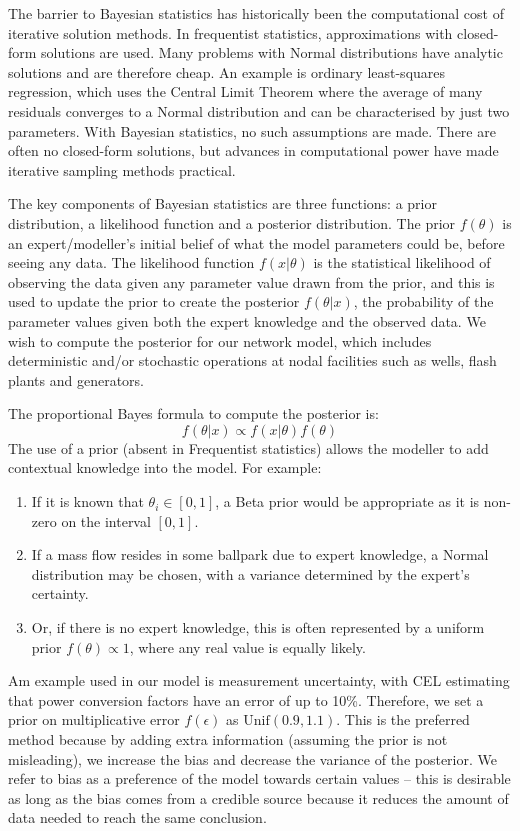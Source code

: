 \documentclass[a4paper, 12pt]{article}
\begin{document}
The barrier to Bayesian statistics has historically been the computational cost of iterative solution methods. In frequentist statistics, approximations with closed-form solutions are used. Many problems with Normal distributions have analytic solutions and are therefore cheap. An example is ordinary least-squares regression, which uses the Central Limit Theorem where the average of many residuals converges to a Normal distribution and can be characterised by just two parameters. With Bayesian statistics, no such assumptions are made. There are often no closed-form solutions, but advances in computational power have made iterative sampling methods practical.

The key components of Bayesian statistics are three functions: a prior distribution, a likelihood function and a posterior distribution. The prior $f(\theta)$ is an expert/modeller's initial belief of what the model parameters could be, before seeing any data. The likelihood function $f(x|\theta)$ is the statistical likelihood of observing the data given any parameter value drawn from the prior, and this is used to update the prior to create the posterior $f(\theta|x)$, the probability of the parameter values given both the expert knowledge and the observed data. We wish to compute the posterior for our network model, which includes deterministic and/or stochastic operations at nodal facilities such as wells, flash plants and generators.

The proportional Bayes formula to compute the posterior is:
\begin{equation}
f(\theta|x) \propto f(x|\theta)f(\theta)
\end{equation}
The use of a prior (absent in Frequentist statistics) allows the modeller to add contextual knowledge into the model. For example:

\begin{enumerate}
\item If it is known that $\theta_i \in [0,1]$, a Beta prior would be appropriate as it is non-zero on the interval $[0, 1]$. 
\item If a mass flow resides in some ballpark due to expert knowledge, a Normal distribution may be chosen, with a variance determined by the expert's certainty.
\item Or, if there is no expert knowledge, this is often represented by a uniform prior $f(\theta)\propto 1$, where any real value is equally likely.
\end{enumerate}

Am example used in our model is measurement uncertainty, with CEL estimating that power conversion factors have an error of up to 10\%. Therefore, we set a prior on multiplicative error $f(\epsilon)$ as $\text{Unif}(0.9,1.1)$. This is the preferred method because by adding extra information (assuming the prior is not misleading), we increase the bias and decrease the variance of the posterior. We refer to bias as a preference of the model towards certain values -- this is desirable as long as the bias comes from a credible source because it reduces the amount of data needed to reach the same conclusion.
\end{document}
